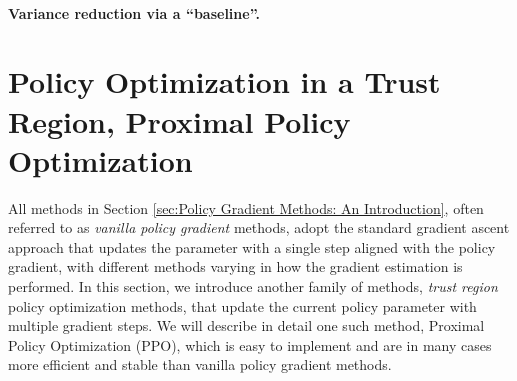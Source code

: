 \paragraph{Variance reduction via a ``baseline''.}

\section{Policy Optimization in a Trust Region, Proximal Policy Optimization}
All methods in Section \ref{sec:Policy Gradient Methods: An Introduction}, often referred to as {\em vanilla policy gradient} methods, adopt the standard gradient ascent approach that updates the parameter with a single step aligned with the policy gradient, with different methods varying in how the gradient estimation is performed.
In this section, we introduce another family of methods, {\em trust region} policy optimization methods, that update the current policy parameter with multiple gradient steps.
We will describe in detail one such method, Proximal Policy Optimization (PPO),
which is easy to implement and are in many cases more efficient and stable than vanilla policy gradient methods.


